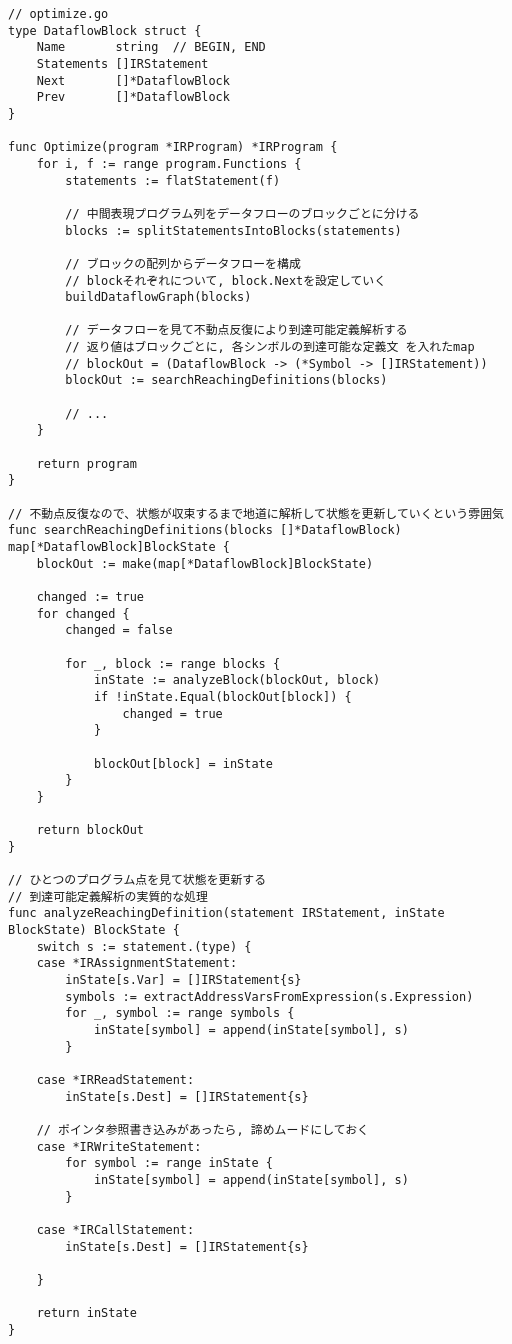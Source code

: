 \documentclass[a4j]{jarticle}
\begin{document}
\begin{verbatim}
// optimize.go
type DataflowBlock struct {
    Name       string  // BEGIN, END
    Statements []IRStatement
    Next       []*DataflowBlock
    Prev       []*DataflowBlock
}

func Optimize(program *IRProgram) *IRProgram {
    for i, f := range program.Functions {
        statements := flatStatement(f)

        // 中間表現プログラム列をデータフローのブロックごとに分ける
        blocks := splitStatementsIntoBlocks(statements)

        // ブロックの配列からデータフローを構成
        // blockそれぞれについて, block.Nextを設定していく
        buildDataflowGraph(blocks)

        // データフローを見て不動点反復により到達可能定義解析する
        // 返り値はブロックごとに, 各シンボルの到達可能な定義文 を入れたmap
        // blockOut = (DataflowBlock -> (*Symbol -> []IRStatement))
        blockOut := searchReachingDefinitions(blocks)

        // ...
    }

    return program
}

// 不動点反復なので、状態が収束するまで地道に解析して状態を更新していくという雰囲気
func searchReachingDefinitions(blocks []*DataflowBlock) map[*DataflowBlock]BlockState {
    blockOut := make(map[*DataflowBlock]BlockState)

    changed := true
    for changed {
        changed = false

        for _, block := range blocks {
            inState := analyzeBlock(blockOut, block)
            if !inState.Equal(blockOut[block]) {
                changed = true
            }

            blockOut[block] = inState
        }
    }

    return blockOut
}

// ひとつのプログラム点を見て状態を更新する
// 到達可能定義解析の実質的な処理
func analyzeReachingDefinition(statement IRStatement, inState BlockState) BlockState {
    switch s := statement.(type) {
    case *IRAssignmentStatement:
        inState[s.Var] = []IRStatement{s}
        symbols := extractAddressVarsFromExpression(s.Expression)
        for _, symbol := range symbols {
            inState[symbol] = append(inState[symbol], s)
        }

    case *IRReadStatement:
        inState[s.Dest] = []IRStatement{s}

    // ポインタ参照書き込みがあったら, 諦めムードにしておく
    case *IRWriteStatement:
        for symbol := range inState {
            inState[symbol] = append(inState[symbol], s)
        }

    case *IRCallStatement:
        inState[s.Dest] = []IRStatement{s}

    }

    return inState
}
\end{verbatim}
\end{document}
